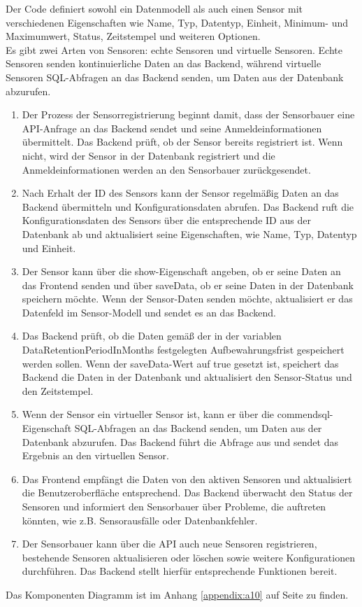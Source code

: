 \begin{flushleft}
	Der Code definiert sowohl ein Datenmodell als auch einen Sensor mit verschiedenen Eigenschaften wie Name, Typ, Datentyp, Einheit, Minimum- und Maximumwert, Status, Zeitstempel und weiteren Optionen.\\
	Es gibt zwei Arten von Sensoren: echte Sensoren und virtuelle Sensoren. Echte Sensoren senden kontinuierliche Daten an das Backend, während virtuelle Sensoren SQL-Abfragen an das Backend senden, um Daten aus der Datenbank abzurufen.
	\\
	\begin{enumerate}
		\item Der Prozess der Sensorregistrierung beginnt damit, dass der Sensorbauer eine \acs{API}-Anfrage an das Backend sendet und seine Anmeldeinformationen übermittelt. Das Backend prüft, ob der Sensor bereits registriert ist. Wenn nicht, wird der Sensor in der Datenbank registriert und die Anmeldeinformationen werden an den Sensorbauer zurückgesendet.
		\item Nach Erhalt der ID des Sensors kann der Sensor regelmäßig Daten an das Backend übermitteln und Konfigurationsdaten abrufen. Das Backend ruft die Konfigurationsdaten des Sensors über die entsprechende ID aus der Datenbank ab und aktualisiert seine Eigenschaften, wie Name, Typ, Datentyp und Einheit.
		\item Der Sensor kann über die show-Eigenschaft angeben, ob er seine Daten an das Frontend senden und über saveData, ob er seine Daten in der Datenbank speichern möchte. Wenn der Sensor-Daten senden möchte, aktualisiert er das Datenfeld im Sensor-Modell und sendet es an das Backend.
		\item Das Backend prüft, ob die Daten gemäß der in der variablen DataRetentionPeriodInMonths festgelegten Aufbewahrungsfrist gespeichert werden sollen. Wenn der saveData-Wert auf true gesetzt ist, speichert das Backend die Daten in der Datenbank und aktualisiert den Sensor-Status und den Zeitstempel.
		\item Wenn der Sensor ein virtueller Sensor ist, kann er über die commendsql-Eigenschaft SQL-Abfragen an das Backend senden, um Daten aus der Datenbank abzurufen. Das Backend führt die Abfrage aus und sendet das Ergebnis an den virtuellen Sensor.
		\item Das Frontend empfängt die Daten von den aktiven Sensoren und aktualisiert die Benutzeroberfläche entsprechend. Das Backend überwacht den Status der Sensoren und informiert den Sensorbauer über Probleme, die auftreten könnten, wie \acs{z.B.} Sensorausfälle oder Datenbankfehler.
		\item Der Sensorbauer kann über die \acs{API} auch neue Sensoren registrieren, bestehende Sensoren aktualisieren oder löschen sowie weitere Konfigurationen durchführen. Das Backend stellt hierfür entsprechende Funktionen bereit.
	\end{enumerate}
	Das Komponenten Diagramm ist im Anhang \ref{appendix:a10} auf Seite \pageref{appendix:a10} zu finden.




\end{flushleft}
